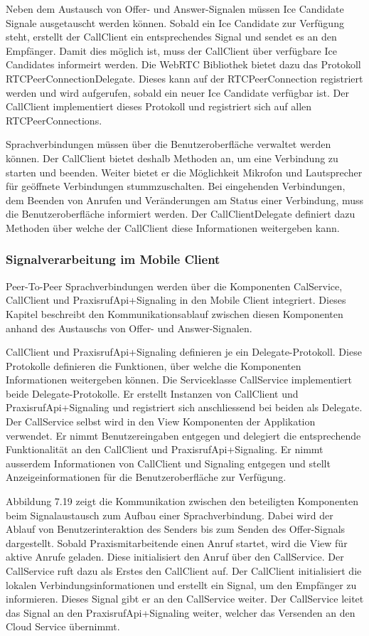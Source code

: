 Neben dem Austausch von Offer- und Answer-Signalen müssen Ice Candidate Signale ausgetauscht werden können.
Sobald ein Ice Candidate zur Verfügung steht, erstellt der CallClient ein entsprechendes Signal und sendet es an den Empfänger.
Damit dies möglich ist, muss der CallClient über verfügbare Ice Candidates informeirt werden.
Die WebRTC Bibliothek bietet dazu das Protokoll RTCPeerConnectionDelegate.
Dieses kann auf der RTCPeerConnection registriert werden und wird aufgerufen, sobald ein neuer Ice Candidate verfügbar ist.
Der CallClient implementiert dieses Protokoll und registriert sich auf allen RTCPeerConnections.

Sprachverbindungen müssen über die Benutzeroberfläche verwaltet werden können.
Der CallClient bietet deshalb Methoden an, um eine Verbindung zu starten und beenden.
Weiter bietet er die Möglichkeit Mikrofon und Lautsprecher für geöffnete Verbindungen stummzuschalten.
Bei eingehenden Verbindungen, dem Beenden von Anrufen und Veränderungen am Status einer Verbindung, muss die Benutzeroberfläche informiert werden.
Der CallClientDelegate definiert dazu Methoden über welche der CallClient diese Informationen weitergeben kann.

\subsubsection{Signalverarbeitung im Mobile Client}

Peer-To-Peer Sprachverbindungen werden über die Komponenten CalService, CallClient und PraxisrufApi+Signaling in den Mobile Client integriert.
Dieses Kapitel beschreibt den Kommunikationsablauf zwischen diesen Komponenten anhand des Austauschs von Offer- und Answer-Signalen.

CallClient und PraxisrufApi+Signaling definieren je ein Delegate-Protokoll.
Diese Protokolle definieren die Funktionen, über welche die Komponenten Informationen weitergeben können.
Die Serviceklasse CallService implementiert beide Delegate-Protokolle.
Er erstellt Instanzen von CallClient und PraxisrufApi+Signaling und registriert sich anschliessend bei beiden als Delegate.
Der CallService selbst wird in den View Komponenten der Applikation verwendet.
Er nimmt Benutzereingaben entgegen und delegiert die entsprechende Funktionalität an den CallClient und PraxisrufApi+Signaling.
Er nimmt ausserdem Informationen von CallClient und Signaling entgegen und stellt Anzeigeinformationen für die Benutzeroberfläche zur Verfügung.

Abbildung 7.19 zeigt die Kommunikation zwischen den beteiligten Komponenten beim Signalaustausch zum Aufbau einer Sprachverbindung.
Dabei wird der Ablauf von Benutzerinteraktion des Senders bis zum Senden des Offer-Signals dargestellt.
Sobald Praxismitarbeitende einen Anruf startet, wird die View für aktive Anrufe geladen.
Diese initialisiert den Anruf über den CallService.
Der CallService ruft dazu als Erstes den CallClient auf.
Der CallClient initialisiert die lokalen Verbindungsinformationen und erstellt ein Signal, um den Empfänger zu informieren.
Dieses Signal gibt er an den CallService weiter.
Der CallService leitet das Signal an den PraxisrufApi+Signaling weiter, welcher das Versenden an den Cloud Service übernimmt.

